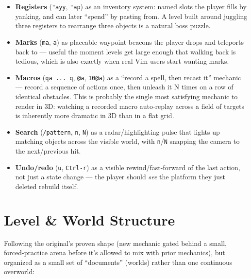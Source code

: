 \documentclass[11pt]{article}
\providecommand{\tightlist}{%
  \setlength{\itemsep}{0pt}\setlength{\parskip}{0pt}}
\begin{document}
\begin{itemize}
\tightlist
\item
  \textbf{Registers} (\texttt{"ayy}, \texttt{"ap}) as an inventory system: named slots the player
  fills by yanking, and can later ``spend'' by pasting from. A level built
  around juggling three registers to rearrange three objects is a natural
  boss puzzle.
\item
  \textbf{Marks} (\texttt{ma}, \texttt{\textasciigrave{}a}) as placeable waypoint beacons the player drops and
  teleports back to --- useful the moment levels get large enough that walking
  back is tedious, which is also exactly when real Vim users start wanting
  marks.
\item
  \textbf{Macros} (\texttt{qa\ ...\ q}, \texttt{@a}, \texttt{10@a}) as a ``record a spell, then recast it''
  mechanic --- record a sequence of actions once, then unleash it N times on a
  row of identical obstacles. This is probably the single most satisfying
  mechanic to render in 3D: watching a recorded macro auto-replay across a
  field of targets is inherently more dramatic in 3D than in a flat grid.
\item
  \textbf{Search} (\texttt{/pattern}, \texttt{n}, \texttt{N}) as a radar/highlighting pulse that lights
  up matching objects across the visible world, with \texttt{n}/\texttt{N} snapping the
  camera to the next/previous hit.
\item
  \textbf{Undo/redo} (\texttt{u}, \texttt{Ctrl-r}) as a visible rewind/fast-forward of the last
  action, not just a state change --- the player should \emph{see} the platform they
  just deleted rebuild itself.
\end{itemize}

\hypertarget{sec-level-world-structure}{%
\section{Level \& World Structure}\label{sec-level-world-structure}}

Following the original's proven shape (new mechanic gated behind a small,
forced-practice arena before it's allowed to mix with prior mechanics), but
organized as a small set of ``documents'' (worlds) rather than one continuous
overworld:
\end{document}
